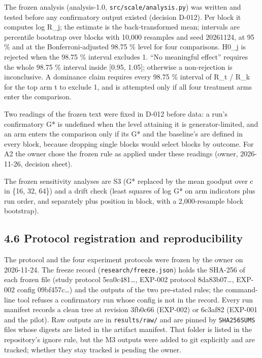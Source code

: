 \documentclass[
]{article}
\begin{document}
The frozen analysis (analysis-1.0, \texttt{src/scale/analysis.py}) was
written and tested before any confirmatory output existed (decision
D-012). Per block it computes log R\_j; the estimate is the
back-transformed mean; intervals are percentile bootstrap over blocks
with 10,000 resamples and seed 20261124, at 95 \% and at the
Bonferroni-adjusted 98.75 \% level for four comparisons. H0\_j is
rejected when the 98.75 \% interval excludes 1. ``No meaningful effect''
requires the whole 98.75 \% interval inside {[}0.95, 1.05{]}; otherwise
a non-rejection is inconclusive. A dominance claim requires every 98.75
\% interval of R\_t / R\_k for the top arm t to exclude 1, and is
attempted only if all four treatment arms enter the comparison.

Two readings of the frozen text were fixed in D-012 before data: a run's
confirmatory G* is undefined when the level attaining it is
generator-limited, and an arm enters the comparison only if its G* and
the baseline's are defined in every block, because dropping single
blocks would select blocks by outcome. For A2 the owner chose the frozen
rule as applied under these readings (owner, 2026-11-26, decision
sheet).

The frozen sensitivity analyses are S3 (G* replaced by the mean goodput
over c in \{16, 32, 64\}) and a drift check (least squares of log G* on
arm indicators plus run order, and separately plus position in block,
with a 2,000-resample block bootstrap).

\subsection{4.6 Protocol registration and
reproducibility}\label{protocol-registration-and-reproducibility}

The protocol and the four experiment protocols were frozen by the owner
on 2026-11-24. The freeze record (\texttt{research/freeze.json}) holds
the SHA-256 of each frozen file (study protocol 5ea0c481\ldots, EXP-002
protocol 8da83b07\ldots, EXP-002 config 09bf457c\ldots) and the outputs
of the two pre-stated rules; the command-line tool refuses a
confirmatory run whose config is not in the record. Every run manifest
records a clean tree at revision 3fb0c66 (EXP-002) or 6c3af82 (EXP-001
and the pilot). Raw outputs are in \texttt{results/raw/} and are pinned
by \texttt{SHA256SUMS} files whose digests are listed in the artifact
manifest. That folder is listed in the repository's ignore rule, but the
M3 outputs were added to git explicitly and are tracked; whether they
stay tracked is pending the owner.
\end{document}
